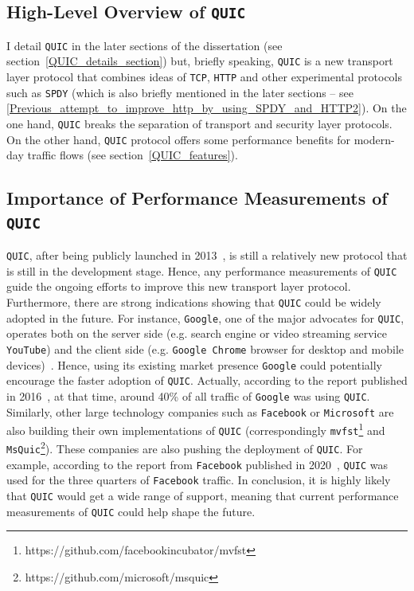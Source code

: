 \documentclass[12pt,a4paper,twoside,openright]{report}
\begin{document}
 

\subsection{High-Level Overview of \texttt{QUIC}}
I detail \texttt{QUIC} in the later sections of the dissertation (see section~\ref{QUIC_details_section}) but, briefly speaking, \texttt{QUIC} is a new transport layer protocol that combines ideas of \texttt{TCP}, \texttt{HTTP} and other experimental protocols such as \texttt{SPDY} (which is also briefly mentioned in the later sections -- see \ref{Previous_attempt_to_improve_http_by_using_SPDY_and_HTTP2}).
On the one hand, \texttt{QUIC} breaks the separation of transport and security layer protocols. 
On the other hand, \texttt{QUIC} protocol offers some performance benefits for modern-day traffic flows (see section~\ref{QUIC_features}).


\subsection{Importance of Performance Measurements of \texttt{QUIC}}

\texttt{QUIC}, after being publicly launched in 2013~\cite{Chromium_Blog_Experimenting_with_quic},  is still a relatively new protocol that is still in the development stage.
Hence, any performance measurements of \texttt{QUIC} guide the ongoing efforts to improve this new transport layer protocol.
Furthermore, there are strong indications showing that \texttt{QUIC} could be widely adopted in the future.
For instance, \texttt{Google}, one of the major advocates for \texttt{QUIC}, operates both on the server side (e.g. search engine or video streaming service \texttt{YouTube}) and the client side (e.g. \texttt{Google Chrome} browser for desktop and mobile devices)~\cite{A_QUICk_Introduction_to_HTTP3}.
Hence, using its existing market presence \texttt{Google} could potentially encourage the faster adoption of \texttt{QUIC}.
Actually, according to the report published in 2016~\cite{RuthJan2018AFLa}, at that time, around 40\% of all traffic of \texttt{Google} was using \texttt{QUIC}.
Similarly, other large technology companies such as \texttt{Facebook} or \texttt{Microsoft} are also building their own implementations of \texttt{QUIC} (correspondingly \texttt{mvfst}\footnote{https://github.com/facebookincubator/mvfst} and \texttt{MsQuic}\footnote{https://github.com/microsoft/msquic}).
These companies are also pushing the deployment of \texttt{QUIC}. 
For example, according to the report from \texttt{Facebook} published in 2020~\cite{how-facebook-is-bringing-quic-to-billions}, \texttt{QUIC} was used for the three quarters of \texttt{Facebook} traffic. 
In conclusion, it is highly likely that \texttt{QUIC} would get a wide range of support, meaning that current performance measurements of \texttt{QUIC} could help shape the future.
\end{document}
